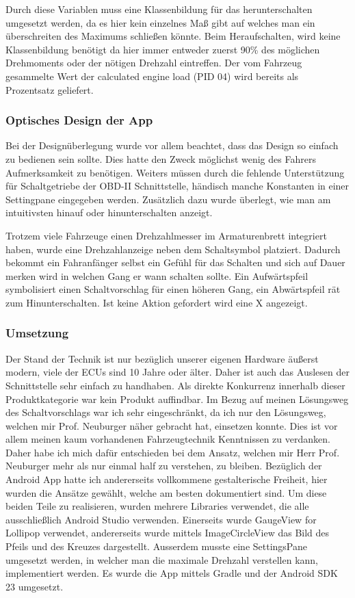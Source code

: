Durch diese Variablen muss eine Klassenbildung für das herunterschalten umgesetzt werden, da es hier kein einzelnes Maß gibt auf welches man ein überschreiten des Maximums schließen könnte. Beim Heraufschalten, wird keine Klassenbildung benötigt da hier immer entweder zuerst 90\% des möglichen Drehmoments oder der nötigen Drehzahl eintreffen. Der vom Fahrzeug gesammelte Wert der calculated engine load (PID 04) wird bereits als Prozentsatz geliefert.
\subsubsection{Optisches Design der App} 
Bei der Designüberlegung wurde vor allem beachtet, dass das Design so einfach zu bedienen sein sollte. Dies hatte den Zweck möglichst wenig des Fahrers Aufmerksamkeit zu benötigen. Weiters müssen durch die fehlende Unterstützung für Schaltgetriebe der OBD-II Schnittstelle, händisch manche Konstanten in einer Settingpane eingegeben werden. Zusätzlich dazu wurde überlegt, wie man am intuitivsten hinauf oder hinunterschalten anzeigt.


Trotzem viele Fahrzeuge einen Drehzahlmesser im Armaturenbrett integriert haben, wurde eine Drehzahlanzeige neben dem Schaltsymbol platziert. Dadurch bekommt ein Fahranfänger selbst ein Gefühl für das Schalten und sich auf Dauer merken wird in welchen Gang er wann schalten sollte. Ein Aufwärtspfeil symbolisiert einen Schaltvorschlag für einen höheren Gang, ein Abwärtspfeil rät zum Hinunterschalten. Ist keine Aktion gefordert wird eine X angezeigt.

\subsubsection{Umsetzung}
Der Stand der Technik ist nur bezüglich unserer eigenen Hardware äußerst modern, viele der ECUs sind 10 Jahre oder älter. Daher ist auch das Auslesen der Schnittstelle sehr einfach zu handhaben. Als direkte Konkurrenz innerhalb dieser Produktkategorie war kein Produkt auffindbar.
Im Bezug auf meinen Lösungsweg des Schaltvorschlags war ich sehr eingeschränkt, da ich nur den Lösungsweg, welchen mir Prof. Neuburger näher gebracht hat, einsetzen konnte. Dies ist vor allem meinen kaum vorhandenen Fahrzeugtechnik Kenntnissen zu verdanken. Daher habe ich mich dafür entschieden bei dem Ansatz, welchen mir Herr Prof. Neuburger mehr als nur einmal half zu verstehen, zu bleiben. Bezüglich der Android App hatte ich andererseits vollkommene gestalterische Freiheit, hier wurden die Ansätze gewählt, welche am besten dokumentiert sind.
Um diese beiden Teile zu realisieren, wurden mehrere Libraries verwendet, die alle ausschließlich Android Studio verwenden.
Einerseits wurde GaugeView for Lollipop \cite{SIMR.CH3-schaltvorschlag.GaugeView} verwendet, andererseits wurde mittels ImageCircleView \cite{SIMR.CH3-schaltvorschlag.CircleImageView} das Bild des Pfeils und des Kreuzes dargestellt.
Ausserdem musste eine SettingsPane umgesetzt werden, in welcher man die maximale Drehzahl verstellen kann, implementiert werden.
Es wurde die App mittels Gradle und der Android SDK 23 umgesetzt.


